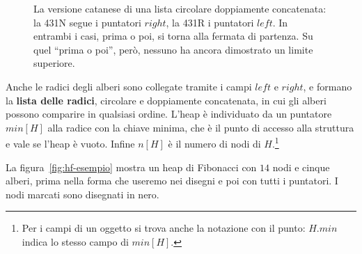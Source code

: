 \begin{figure}[htbp]
\centering
{}
\caption{La versione catanese di una lista circolare doppiamente concatenata: la 431N segue i puntatori $\mathit{right}$, la 431R i puntatori $\mathit{left}$. In entrambi i casi, prima o poi, si torna alla fermata di partenza. Su quel ``prima o poi'', però, nessuno ha ancora dimostrato un limite superiore.}
\label{fig:hf-circolari}
\end{figure}

Anche le radici degli alberi sono collegate tramite i campi $\mathit{left}$ e $\mathit{right}$, e formano la \textbf{lista delle radici}, circolare e doppiamente concatenata, in cui gli alberi possono comparire in qualsiasi ordine. L'heap è individuato da un puntatore $\mathit{min}[H]$ alla radice con la chiave minima, che è il punto di accesso alla struttura e vale \Nil{} se l'heap è vuoto. Infine $n[H]$ è il numero di nodi di $H$.\footnote{Per i campi di un oggetto si trova anche la notazione con il punto: $H.\mathit{min}$ indica lo stesso campo di $\mathit{min}[H]$.}

La figura~\ref{fig:hf-esempio} mostra un heap di Fibonacci con $14$ nodi e cinque alberi, prima nella forma che useremo nei disegni e poi con tutti i puntatori. I nodi marcati sono disegnati in nero.

